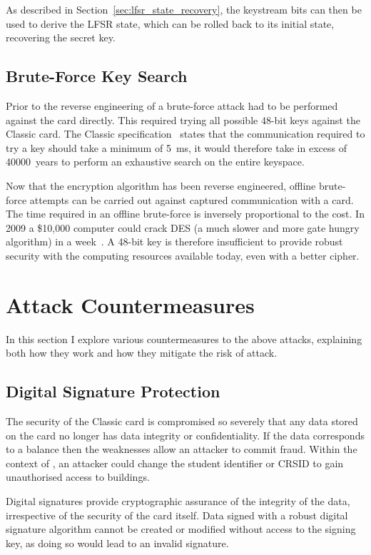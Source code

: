 \documentclass[dissertation.tex]{subfiles}
\begin{document}
  As described in Section~\vref{sec:lfsr_state_recovery}, the keystream bits can then be used to derive the LFSR state, which can be rolled back to its initial state, recovering the secret key.

  \subsection{Brute-Force Key Search}

  Prior to the reverse engineering of \crypto{} a brute-force attack had to be performed against the card directly. This required trying all possible 48-bit keys against the \mifare{} Classic card. The \mifare{} Classic specification~\cite{semiconductors2002mifare} states that the communication required to try a key should take a minimum of \SI{5}{ms}, it would therefore take in excess of \SI{40000}{years} to perform an exhaustive search on the entire keyspace.

  Now that the encryption algorithm has been reverse engineered, offline brute-force attempts can be carried out against captured communication with a card. The time required in an offline brute-force is inversely proportional to the cost. In 2009 a \$10,000 computer could crack DES (a much slower and more gate hungry algorithm) in a week~\cite{kumar2006breaking}. A 48-bit key is therefore insufficient to provide robust security with the computing resources available today, even with a better cipher.


  \section{Attack Countermeasures}

  In this section I explore various countermeasures to the above attacks, explaining both how they work and how they mitigate the risk of attack.

  \subsection{Digital Signature Protection}
  The security of the \mifare{} Classic card is compromised so severely that any data stored on the card no longer has data integrity or confidentiality. If the data corresponds to a balance then the weaknesses allow an attacker to commit fraud. Within the context of \UoC{}, an attacker could change the student identifier or CRSID to gain unauthorised access to buildings.

  Digital signatures provide cryptographic assurance of the integrity of the data, irrespective of the security of the card itself. Data signed with a robust digital signature algorithm cannot be created or modified without access to the signing key, as doing so would lead to an invalid signature.
\end{document}
